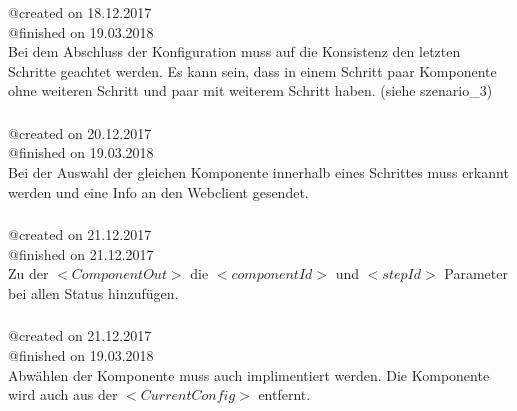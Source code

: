 \documentclass{article}
\begin{document}
\subsubsection{}
@created on 18.12.2017\\
@finished on 19.03.2018\\

Bei dem Abschluss der Konfiguration muss auf die Konsistenz den letzten
Schritte geachtet werden. Es kann sein, dass in einem Schritt paar Komponente
ohne weiteren Schritt und paar mit weiterem Schritt haben. (siehe
szenario\_3)\\

\subsubsection{}
@created on 20.12.2017\\
@finished on 19.03.2018\\

Bei der Auswahl der gleichen Komponente innerhalb eines Schrittes muss erkannt
werden und eine Info an den Webclient gesendet.\\

\subsubsection{}
@created on 21.12.2017\\
@finished on 21.12.2017\\

Zu der $<ComponentOut>$ die $<componentId>$ und $<stepId>$ Parameter bei
allen Status hinzuf\"ugen.\\

\subsubsection{}
@created on 21.12.2017\\
@finished on 19.03.2018\\

Abw\"ahlen der Komponente muss auch implimentiert werden. Die Komponente wird
auch aus der $<CurrentConfig>$ entfernt.\\
\end{document}
